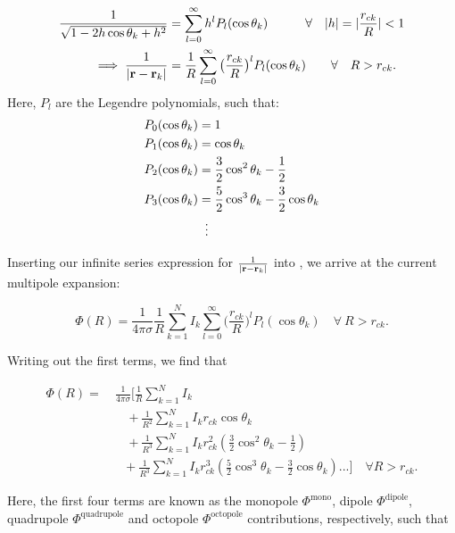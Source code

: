 \begin{align*}\label{eq:legendre}
\frac{1}{\sqrt{1 - 2h\cos \theta_k + h^2}} &= \sum_{l = 0}^\infty h^l P_l(\cos \theta_k) \quad \quad \quad \forall \quad |h| = |\frac{r_{ck}}{R}| < 1 \\
\implies \frac{1}{|{\bf r} - {\bf r}_k|} &= \frac{1}{R} \sum_{l = 0}^\infty \big(\frac{r_{ck}}{R}\big)^l P_l(\cos \theta_k) \quad \quad \forall \quad R > r_{ck}.
\end{align*}
Here, $P_l$  are the Legendre polynomials, such that:
\begin{align*}
P_0 (\cos \theta_k) &= 1 \\
P_1 (\cos \theta_k) &= \cos \theta_k \\
P_2 (\cos \theta_k) &= \frac{3}{2} \cos^2 \theta_k - \frac{1}{2} \\
P_3 (\cos \theta_k) &= \frac{5}{2} \cos^3 \theta_k - \frac{3}{2}\cos \theta_k \\
&\;\;\vdots \notag
\end{align*}

Inserting our infinite series expression for $\frac{1}{|{\bf r} - {\bf r}_k|}$ into , we arrive at the current multipole expansion:

\begin{equation}\label{eq:multipole_compact}
\Phi (R) = \frac{1}{4 \pi \sigma}\frac{1}{R} \sum_{k=1}^N I_k \sum_{l = 0}^\infty \big(\frac{r_{ck}}{R}\big)^l P_l(\cos \theta_k) \quad \forall~ R > r_{ck}.
\end{equation}

Writing out the first terms, we find that

\begin{align}\label{eq:multipole}
\Phi(R) =~& 
\frac{1}{4 \pi \sigma} \Bigg[\frac{1}{R} \sum_{k=1}^N I_k \nonumber\\
&~~~~+ \frac{1}{R^2} \sum_{k=1}^N I_k r_{ck} \cos \theta_k \\
&~~~~+  \frac{1}{R^3} \sum_{k=1}^N I_k r_{ck}^2 \left( \frac{3}{2} \cos^2 \theta_k - \frac{1}{2} \right) \nonumber \\
&~~~ +  \frac{1}{R^3} \sum_{k=1}^N I_k r_{ck}^3 \left( \frac{5}{2} \cos^3 \theta_k - \frac{3}{2} \cos \theta_k \right) ... \nonumber \Bigg] \quad \forall R > r_{ck}.
\end{align}

Here, the first four terms are known as the monopole $\Phi^{\mathrm{mono}}$, dipole $\Phi^{\mathrm{dipole}}$, quadrupole $\Phi^{\mathrm{quadrupole}}$ and octopole $\Phi^{\mathrm{octopole}}$ contributions, respectively, such that

